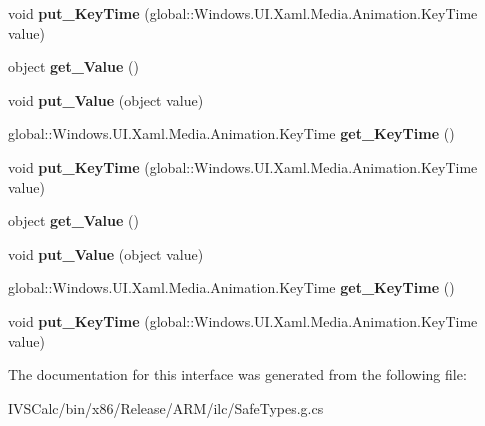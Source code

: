 \begin{DoxyCompactItemize}
void {\bfseries put\+\_\+\+Key\+Time} (global\+::\+Windows.\+U\+I.\+Xaml.\+Media.\+Animation.\+Key\+Time value)
\item 
\mbox{\label{interface_windows_1_1_u_i_1_1_xaml_1_1_media_1_1_animation_1_1_i_object_key_frame_a666644384dad0aa2681d1c72775e1946}} 
object {\bfseries get\+\_\+\+Value} ()
\item 
\mbox{\label{interface_windows_1_1_u_i_1_1_xaml_1_1_media_1_1_animation_1_1_i_object_key_frame_ace1eb8eee944c8ccea95a4b439ff3f27}} 
void {\bfseries put\+\_\+\+Value} (object value)
\item 
\mbox{\label{interface_windows_1_1_u_i_1_1_xaml_1_1_media_1_1_animation_1_1_i_object_key_frame_a5a5e7923940305c167ff4aeadbb918e1}} 
global\+::\+Windows.\+U\+I.\+Xaml.\+Media.\+Animation.\+Key\+Time {\bfseries get\+\_\+\+Key\+Time} ()
\item 
\mbox{\label{interface_windows_1_1_u_i_1_1_xaml_1_1_media_1_1_animation_1_1_i_object_key_frame_afad5ba469666b91faed8df55c0c7efca}} 
void {\bfseries put\+\_\+\+Key\+Time} (global\+::\+Windows.\+U\+I.\+Xaml.\+Media.\+Animation.\+Key\+Time value)
\item 
\mbox{\label{interface_windows_1_1_u_i_1_1_xaml_1_1_media_1_1_animation_1_1_i_object_key_frame_a666644384dad0aa2681d1c72775e1946}} 
object {\bfseries get\+\_\+\+Value} ()
\item 
\mbox{\label{interface_windows_1_1_u_i_1_1_xaml_1_1_media_1_1_animation_1_1_i_object_key_frame_ace1eb8eee944c8ccea95a4b439ff3f27}} 
void {\bfseries put\+\_\+\+Value} (object value)
\item 
\mbox{\label{interface_windows_1_1_u_i_1_1_xaml_1_1_media_1_1_animation_1_1_i_object_key_frame_a5a5e7923940305c167ff4aeadbb918e1}} 
global\+::\+Windows.\+U\+I.\+Xaml.\+Media.\+Animation.\+Key\+Time {\bfseries get\+\_\+\+Key\+Time} ()
\item 
\mbox{\label{interface_windows_1_1_u_i_1_1_xaml_1_1_media_1_1_animation_1_1_i_object_key_frame_afad5ba469666b91faed8df55c0c7efca}} 
void {\bfseries put\+\_\+\+Key\+Time} (global\+::\+Windows.\+U\+I.\+Xaml.\+Media.\+Animation.\+Key\+Time value)
\end{DoxyCompactItemize}


The documentation for this interface was generated from the following file\+:\begin{DoxyCompactItemize}
\item 
I\+V\+S\+Calc/bin/x86/\+Release/\+A\+R\+M/ilc/Safe\+Types.\+g.\+cs\end{DoxyCompactItemize}

